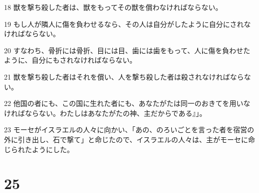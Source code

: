 \par 18 獣を撃ち殺した者は、獣をもってその獣を償わなければならない。
\par 19 もし人が隣人に傷を負わせるなら、その人は自分がしたように自分にされなければならない。
\par 20 すなわち、骨折には骨折、目には目、歯には歯をもって、人に傷を負わせたように、自分にもされなければならない。
\par 21 獣を撃ち殺した者はそれを償い、人を撃ち殺した者は殺されなければならない。
\par 22 他国の者にも、この国に生れた者にも、あなたがたは同一のおきてを用いなければならない。わたしはあなたがたの神、主だからである』」。
\par 23 モーセがイスラエルの人々に向かい、「あの、のろいごとを言った者を宿営の外に引き出し、石で撃て」と命じたので、イスラエルの人々は、主がモーセに命じられたようにした。

\chapter{25}

